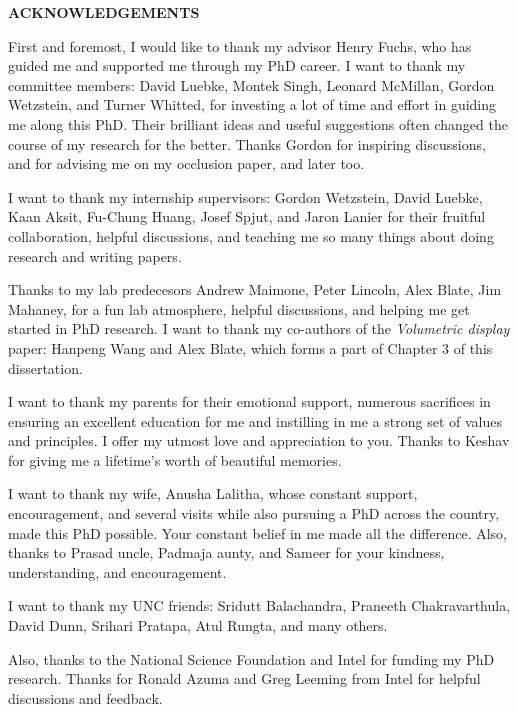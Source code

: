 
\begin{center}
\vspace*{52pt}
{\Large \textbf{ACKNOWLEDGEMENTS}}
\end{center}


First and foremost, I would like to thank my advisor Henry Fuchs, who has guided me and supported me through my PhD career. 
I want to thank my committee members: David Luebke, Montek Singh, Leonard McMillan, Gordon Wetzstein, and Turner Whitted, for investing a lot of time and effort in guiding me along this PhD. 
Their brilliant ideas and useful suggestions often changed the course of my research for the better. 
Thanks Gordon for inspiring discussions, and for advising me on my occlusion paper, and later too. 

I want to thank my internship supervisors: Gordon Wetzstein, David Luebke, Kaan Aksit, Fu-Chung Huang, Josef Spjut, and Jaron Lanier for their fruitful collaboration, helpful discussions, and teaching me so many things about doing research and writing papers. 

Thanks to my lab predecesors Andrew Maimone, Peter Lincoln, Alex Blate, Jim Mahaney, for a fun lab atmosphere, helpful discussions, and helping me get started in PhD research. I want to thank my co-authors of the \emph{Volumetric display} paper: Hanpeng Wang and Alex Blate, which forms a part of Chapter 3 of this dissertation.

I want to thank my parents for their emotional support, numerous sacrifices in ensuring an excellent education for me and instilling in me a strong set of values and principles. I offer my utmost love and appreciation to you. Thanks to Keshav for giving me a lifetime's worth of beautiful memories. 

I want to thank my wife, Anusha Lalitha, whose constant support, encouragement, and several visits while also pursuing a PhD across the country, made this PhD possible. Your constant belief in me made all the difference. Also, thanks to Prasad uncle, Padmaja aunty, and Sameer for your kindness, understanding, and encouragement.

I want to thank my UNC friends: Sridutt Balachandra, Praneeth Chakravarthula, David Dunn, Srihari Pratapa, Atul Rungta, and many others. 

Also, thanks to the National Science Foundation and Intel for funding my PhD research. Thanks for Ronald Azuma and Greg Leeming from Intel for helpful discussions and feedback.

\clearpage 
